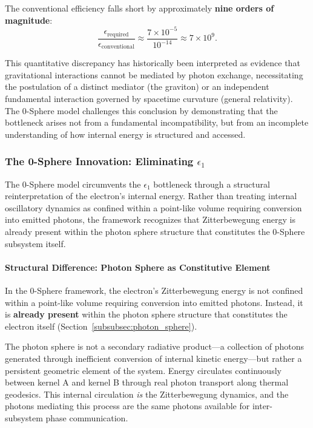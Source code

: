 \documentclass[12pt,letterpaper]{article}
\begin{document}
The conventional efficiency falls short by approximately \textbf{nine orders of magnitude}:
\begin{equation}
\frac{\epsilon_{\text{required}}}{\epsilon_{\text{conventional}}} \approx \frac{7 \times 10^{-5}}{10^{-14}} \approx 7 \times 10^{9}.
\end{equation}

This quantitative discrepancy has historically been interpreted as evidence that gravitational interactions cannot be mediated by photon exchange, necessitating the postulation of a distinct mediator (the graviton) or an independent fundamental interaction governed by spacetime curvature (general relativity). The 0-Sphere model challenges this conclusion by demonstrating that the bottleneck arises not from a fundamental incompatibility, but from an incomplete understanding of how internal energy is structured and accessed.


\subsubsection{The 0-Sphere Innovation: Eliminating $\epsilon_1$}
\label{subsubsec:eliminating_epsilon1}

The 0-Sphere model circumvents the $\epsilon_1$ bottleneck through a structural reinterpretation of the electron's internal energy. Rather than treating internal oscillatory dynamics as confined within a point-like volume requiring conversion into emitted photons, the framework recognizes that Zitterbewegung energy is already present within the photon sphere structure that constitutes the 0-Sphere subsystem itself.

\paragraph{Structural Difference: Photon Sphere as Constitutive Element}

In the 0-Sphere framework, the electron's Zitterbewegung energy is not confined within a point-like volume requiring conversion into emitted photons. Instead, it is \textbf{already present} within the photon sphere structure that constitutes the electron itself (Section~\ref{subsubsec:photon_sphere}).

The photon sphere is not a secondary radiative product—a collection of photons generated through inefficient conversion of internal kinetic energy—but rather a persistent geometric element of the system. Energy circulates continuously between kernel A and kernel B through real photon transport along thermal geodesics. This internal circulation \textit{is} the Zitterbewegung dynamics, and the photons mediating this process are the same photons available for inter-subsystem phase communication.
\end{document}
